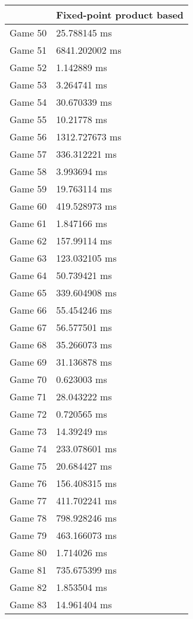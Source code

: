 \begin{tabular}{|l|l|}
	\hline
	& Fixed-point product based \\ \hline
	Game 50 & 25.788145 ms \\ \hline
	Game 51 & 6841.202002 ms \\ \hline
	Game 52 & 1.142889 ms \\ \hline
	Game 53 & 3.264741 ms \\ \hline
	Game 54 & 30.670339 ms \\ \hline
	Game 55 & 10.21778 ms \\ \hline
	Game 56 & 1312.727673 ms \\ \hline
	Game 57 & 336.312221 ms \\ \hline
	Game 58 & 3.993694 ms \\ \hline
	Game 59 & 19.763114 ms \\ \hline
	Game 60 & 419.528973 ms \\ \hline
	Game 61 & 1.847166 ms \\ \hline
	Game 62 & 157.99114 ms \\ \hline
	Game 63 & 123.032105 ms \\ \hline
	Game 64 & 50.739421 ms \\ \hline
	Game 65 & 339.604908 ms \\ \hline
	Game 66 & 55.454246 ms \\ \hline
	Game 67 & 56.577501 ms \\ \hline
	Game 68 & 35.266073 ms \\ \hline
	Game 69 & 31.136878 ms \\ \hline
	Game 70 & 0.623003 ms \\ \hline
	Game 71 & 28.043222 ms \\ \hline
	Game 72 & 0.720565 ms \\ \hline
	Game 73 & 14.39249 ms \\ \hline
	Game 74 & 233.078601 ms \\ \hline
	Game 75 & 20.684427 ms \\ \hline
	Game 76 & 156.408315 ms \\ \hline
	Game 77 & 411.702241 ms \\ \hline
	Game 78 & 798.928246 ms \\ \hline
	Game 79 & 463.166073 ms \\ \hline
	Game 80 & 1.714026 ms \\ \hline
	Game 81 & 735.675399 ms \\ \hline
	Game 82 & 1.853504 ms \\ \hline
	Game 83 & 14.961404 ms \\ \hline

\end{tabular}
